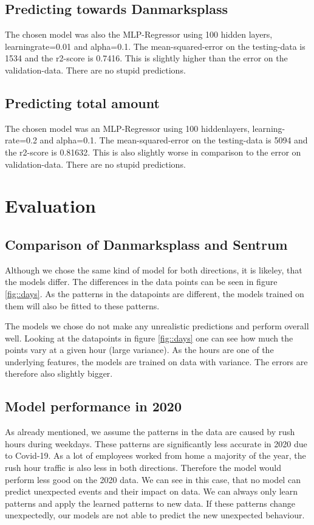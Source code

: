 \documentclass[12pt,a4paper]{scrartcl}		%
\begin{document}
\subsection{Predicting towards Danmarksplass}
The chosen model was also the MLP-Regressor using 100 hidden layers, learningrate=0.01 and alpha=0.1. The mean-squared-error on the testing-data is 1534 and the r2-score is 0.7416. 
This is slightly higher than the error on the validation-data. There are no stupid predictions.
\subsection{Predicting total amount}
The chosen model was an MLP-Regressor using 100 hiddenlayers, learning-rate=0.2 and alpha=0.1. The mean-squared-error on the testing-data is 5094 and the r2-score is 0.81632. 
This is also slightly worse in comparison to the error on validation-data. There are no stupid predictions. 

\section{Evaluation}
\subsection{Comparison of Danmarksplass and Sentrum}
Although we chose the same kind of model for both directions, it is likeley, that the models differ.
The differences in the data points can be seen in figure \ref{fig::days}. As the patterns in the datapoints 
are different, the models trained on them will also be fitted to these patterns.

The models we chose do not make any unrealistic predictions and perform overall well. 
Looking at the datapoints in figure \ref{fig::days} one can see how much the points vary at a given hour (large variance).
As the hours are one of the underlying features, the models are trained on data with variance.
The errors are therefore also slightly bigger.

\subsection{Model performance in 2020}
As already mentioned, we assume the patterns in the data are caused by rush hours during weekdays. These patterns are significantly less accurate in 2020 due to Covid-19.
As a lot of employees worked from home a majority of the year, the rush hour traffic is also less in both directions. Therefore the model would perform less good on the 2020 data.
We can see in this case, that no model can predict unexpected events and their impact on data. We can always only learn patterns and apply the learned patterns to new data.
If these patterns change unexpectedly, our models are not able to predict the new unexpected behaviour.
\end{document}
